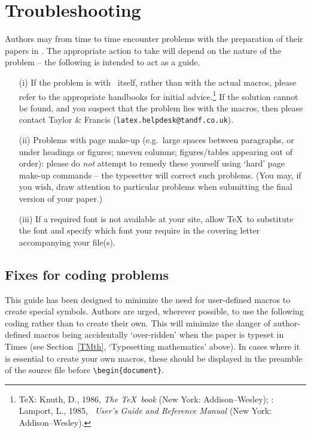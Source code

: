 \documentclass[]{tMAM2e}
\begin{document}
\section{Troubleshooting}

Authors may from time to time encounter problems with the  preparation
of their papers in \LaTeXe. The appropriate  action  to
take will depend on the nature of the problem -- the following is
intended to act as a guide.
%
\begin{enumerate}
\item[(i)] If the problem is with \LaTeXe\ itself, rather than with the
actual macros, please refer to the appropriate handbooks for
initial advice.\footnote{\TeX: Knuth, D., 1986, {\it The \TeX\
book} (New York: Addison--Wesley); \LaTeXe: Lamport, L., 1985,
{\it \LaTeXe\ \nobreak User's Guide and Reference Manual} (New
York: Addison--Wesley).} If the solution cannot be found, and you
suspect that the problem lies with the macros, then please contact
Taylor \& Francis ({\tt latex.helpdesk@tandf.co.uk}).

\item[(ii)] Problems with page make-up (e.g.\ large spaces between paragraphs, or under headings or
figures; uneven columns; figures/tables appearing out of order):
please do {\itshape not\/} attempt to remedy these yourself using
`hard' page make-up commands -- the typesetter will correct such
problems. (You may, if you wish, draw attention to particular
problems when submitting the final version of your paper.)

\item[(iii)] If a required font is not available at your site, allow \TeX\
to substitute the font and specify which font your require in the
covering letter accompanying your file(s).

\end{enumerate}


\subsection{Fixes for coding problems}

This guide has been designed to minimize the need for user-defined macros to  create special symbols. Authors
are urged, wherever possible, to use the following coding rather than to create their own. This will minimize
the danger of author-defined macros being accidentally  `over-ridden' when the paper is typeset in Times (see
Section~\ref{TMth}, `Typesetting mathematics' above). In cases where it is essential to create your own macros,
these should be displayed in the preamble of the source file before \verb"\begin{document}".
\end{document}
